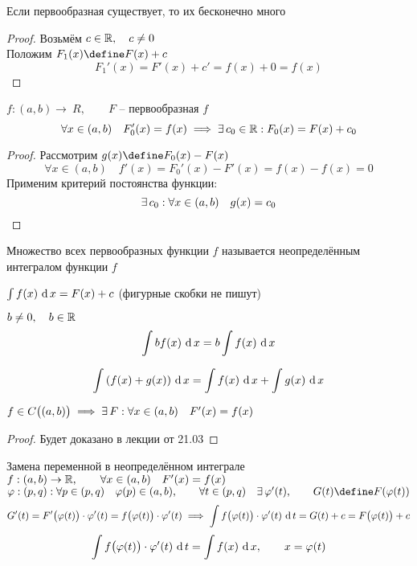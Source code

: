 \begin{note}
	Если первообразная существует, то их бесконечно много
\end{note}

\begin{proof}
	Возьмём $ c \in \R, \quad c \ne 0 $ \\
    Положим $ F_1(x) \define F(x) + c $
    $$ F_1'(x) = F'(x) + c' = f(x) + 0 = f(x) $$
\end{proof}

\begin{theorem}
	$ f : (a, b) \to \ R, \qquad F $ -- первообразная $f$
    $$ \forall x \in (a, b) \quad F_0'(x) = f(x) \implies \exist c_0 \in \R : F_0(x) = F(x) + c_0 $$
\end{theorem}

\begin{proof}
	Рассмотрим $ g(x) \define F_0(x) - F(x) $
    $$ \forall x \in (a, b) \quad f'(x) = F_0'(x) - F'(x) = f(x) - f(x) = 0 $$
    Применим критерий постоянства функции:
    $$ \exist c_0 : \forall x \in (a, b) \quad g(x) = c_0 $$
\end{proof}

\begin{definition}
	Множество всех первообразных функции $f$ называется неопределённым интегралом функции $f$
\end{definition}

\begin{notation}
    $ \uint{f(x)} = F(x) + c $ (фигурные скобки не пишут)
\end{notation}

\begin{property}[линейность]
	$ b \ne 0, \quad b \in \R $
    $$ \uint{bf(x)} = b \uint{f(x)} $$
\end{property}

\begin{property}[аддитивность]
    $$ \uint{(f(x) + g(x))} = \uint{f(x)} + \uint{g(x)} $$
\end{property}

\begin{theorem}
    $ f \in C \big( (a, b) \big) \implies \exist F : \forall x \in (a, b) \quad F'(x) = f(x) $
\end{theorem}

\begin{proof}
	Будет доказано в лекции от 21.03
\end{proof}

\begin{undefthm}{Замена переменной в неопределённом интеграле}
    \hfill \\
	$ f : (a, b) \to \R, \qquad \forall x \in (a, b) \quad F'(x) = f(x) $ \\
    $ \vphi : (p, q) : \forall p \in (p, q) \quad \vphi(p) \in (a, b), \qquad \forall t \in (p, q) \quad \exist \vphi'(t), \qquad G(t) \define F(\vphi(t)) $
    $$ G'(t) = F' \big( \vphi(t) \big) \cdot \vphi'(t) = f \big( \vphi(t) \big) \cdot \vphi'(t) \implies \uint[t]{f \big( \vphi(t) \big) \cdot \vphi'(t)} = G(t) + c = F \big( \vphi(t) \big) + c $$
    $$ \uint[t]{f \big(\vphi(t) \big) \cdot \vphi'(t)} = \uint{f(x)}, \qquad x = \vphi(t) $$
\end{undefthm}


